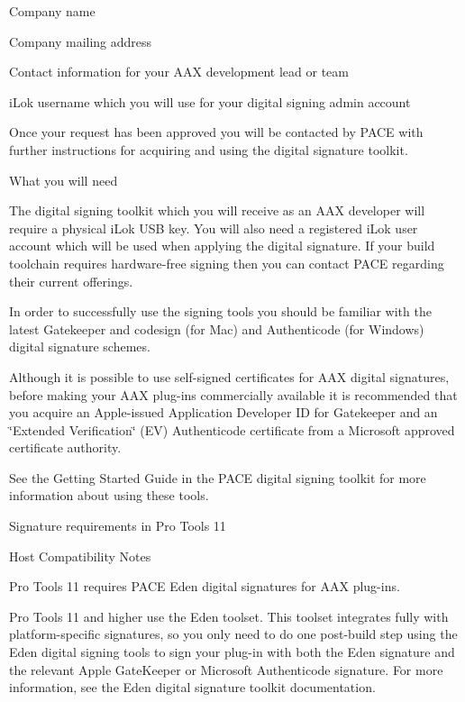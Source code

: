 \begin{DoxyItemize}
\item Company name
\item Company mailing address
\item Contact information for your A\+AX development lead or team
\item i\+Lok username which you will use for your digital signing admin account
\end{DoxyItemize}

Once your request has been approved you will be contacted by P\+A\+CE with further instructions for acquiring and using the digital signature toolkit.

 What you will need

The digital signing toolkit which you will receive as an A\+AX developer will require a physical i\+Lok U\+SB key. You will also need a registered i\+Lok user account which will be used when applying the digital signature. If your build toolchain requires hardware-\/free signing then you can contact P\+A\+CE regarding their current offerings.

In order to successfully use the signing tools you should be familiar with the latest Gatekeeper and {\ttfamily codesign} (for Mac) and Authenticode (for Windows) digital signature schemes.

Although it is possible to use self-\/signed certificates for A\+AX digital signatures, before making your A\+AX plug-\/ins commercially available it is recommended that you acquire an Apple-\/issued Application Developer ID for Gatekeeper and an \char`\"{}\+Extended Verification\char`\"{} (EV) Authenticode certificate from a Microsoft approved certificate authority.

See the Getting Started Guide in the P\+A\+CE digital signing toolkit for more information about using these tools.

 Signature requirements in Pro Tools 11

 \begin{DoxyRefDesc}{Host Compatibility Notes}
\item[\mbox{\hyperlink{a00786__compatibility_notes000012}{Host Compatibility Notes}}]Pro Tools 11 requires P\+A\+CE Eden digital signatures for A\+AX plug-\/ins.\end{DoxyRefDesc}


Pro Tools 11 and higher use the Eden toolset. This toolset integrates fully with platform-\/specific signatures, so you only need to do one post-\/build step using the Eden digital signing tools to sign your plug-\/in with both the Eden signature and the relevant Apple Gate\+Keeper or Microsoft Authenticode signature. For more information, see the Eden digital signature toolkit documentation.

